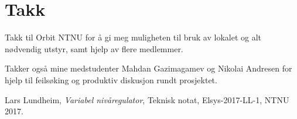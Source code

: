 \documentclass[a4paper,11pt,norsk]{article}
\begin{document}
\section{Takk}
Takk til Orbit NTNU for å gi meg muligheten til bruk av lokalet og alt nødvendig utstyr, samt hjelp av flere medlemmer. 

Takker også mine medstudenter Mahdan Gazimagamev og Nikolai Andresen for hjelp til feilsøking og produktiv diskusjon rundt prosjektet. 
{}
\begin{thebibliography}{99}

  Lars Lundheim,
  \emph{Variabel nivåregulator},
  Teknisk notat,
  Elsys-2017-LL-1,
  NTNU 2017.

\end{thebibliography}
\end{document}

